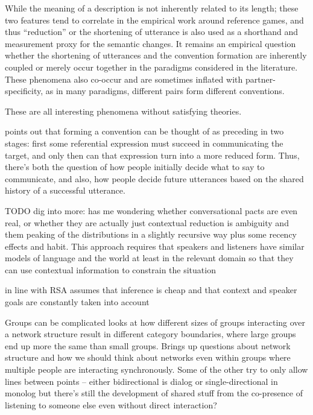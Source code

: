 \documentclass[]{article}
\begin{document}
While the meaning of a description is not inherently related to its length; these two features tend to correlate in the empirical work around reference games, and thus ``reduction'' or the shortening of utterance is also used as a shorthand and measurement proxy for the semantic changes. It remains an empirical question whether the shortening of utterances and the convention formation are inherently coupled or merely occur together in the paradigms considered in the literature. These phenomena also co-occur and are sometimes inflated with partner-specificity, as in many paradigms, different pairs form different conventions. 

These are all interesting phenomena without satisfying theories. 

\cite{leung2023} points out that forming a convention can be thought of as preceding in two stages: first some referential expression must succeed in communicating the target, and only then can that expression turn into a more reduced form. Thus, there's both the question of how people initially decide what to say to communicate, and also, how people decide future utterances based on the shared history of a successful utterance. 

TODO dig into more: \cite{piantadosi2012} has me wondering whether conversational pacts are even real, or whether they are actually just contextual reduction is ambiguity and them peaking of the distributions in a slightly recursive way plus some recency effects and habit. This approach requires that speakers and listeners have similar models of language and the world at least in the relevant domain so that they can use contextual information to constrain the situation 

\cite{piantadosi2012} in line with RSA assumes that inference is cheap and that context and speaker goals are constantly taken into account 

Groups can be complicated \cite{guilbeault2021} looks at how different sizes of groups interacting over a network structure result in different category boundaries, where large groups end up more the same than small groups. Brings up questions about network structure and how we should think about networks even within groups where multiple people are interacting synchronously. Some of the other try to only allow lines between points -- either bidirectional is dialog or single-directional in monolog but there's still the development of shared stuff from the co-presence of listening to someone else even without direct interaction? 
\end{document}
